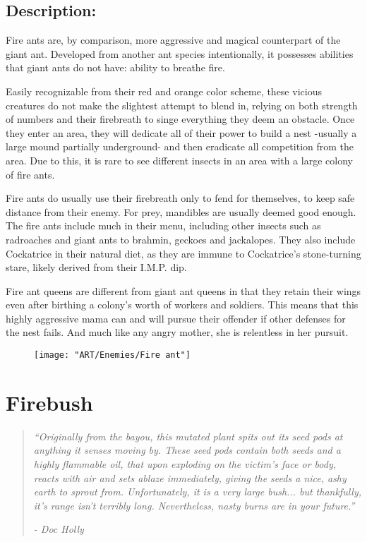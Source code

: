 \documentclass[11pt,a4paper,twocolumn]{book}
\begin{document}
	\vfill
	\subsection*{Description:}
	Fire ants are, by comparison, more aggressive and magical counterpart of the giant ant. Developed from another ant species intentionally, it possesses abilities that giant ants do not have: ability to breathe fire.
	
	Easily recognizable from their red and orange color scheme, these vicious creatures do not make the slightest attempt to blend in, relying on both strength of numbers and their firebreath to singe everything they deem an obstacle. Once they enter an area, they will dedicate all of their power to build a nest -usually a large mound partially underground- and then eradicate all competition from the area. Due to this, it is rare to see different insects in an area with a large colony of fire ants.
	
	\bigskip
	Fire ants do usually use their firebreath only to fend for themselves, to keep safe distance from their enemy. For prey, mandibles are usually deemed good enough. The fire ants include much in their menu, including other insects such as radroaches and giant ants to brahmin, geckoes and jackalopes. They also include Cockatrice in their natural diet, as they are immune to Cockatrice's stone-turning stare, likely derived from their I.M.P. dip.
	
	Fire ant queens are different from giant ant queens in that they retain their wings even after birthing a colony's worth of workers and soldiers. This means that this highly aggressive mama can and will pursue their offender if other defenses for the nest fails. And much like any angry mother, she is relentless in her pursuit.
	
	\begin{figure}
		\centering
		\texttt{[image: "ART/Enemies/Fire ant"]}
	\end{figure}
	
	
	\clearpage
	
	\section*{Firebush}
	\begin{quote}
		\emph{``Originally from the bayou, this mutated plant spits out its seed pods at anything it senses moving by. These seed pods contain both seeds and a highly flammable oil, that upon exploding on the victim's face or body, reacts with air and sets ablaze immediately, giving the seeds a nice, ashy earth to sprout from. Unfortunately, it is a very large bush... but thankfully, it's range isn't terribly long. Nevertheless, nasty burns are in your future.''}
		
		\emph{-	Doc Holly}
	\end{quote}
\end{document}
